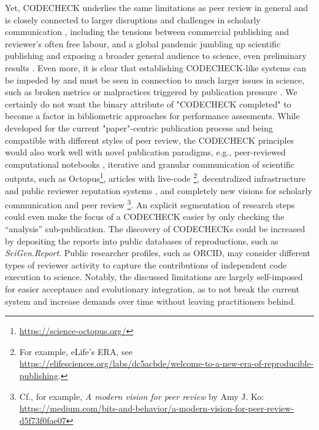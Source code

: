 \documentclass[12pt]{article}
\begin{document}
Yet, CODECHECK underlies the same limitations as peer review
in general and is closely connected to larger disruptions and challenges
in scholarly communication
\cite{eglen_recent_2018,tennant_ten_2019,fyfe_mission_2019}, 
including the tensions between commercial publishing and reviewer's often
free labour, and a global pandemic jumbling up scientific publishing
and exposing a broader general audience to science, even preliminary 
results \cite{munafo_what_2020}.
Even more, it is clear that establishing CODECHECK-like systems can be 
impeded by and must be seen in connection to much larger issues in 
science, such as broken metrics or malpractices triggered by publication
pressure \cite{piwowar_altmetrics:_2013,nosek_promoting_2015}.
We certainly do not want the binary attribute of "CODECHECK completed"
to become a factor in bibliometric approaches for performance assesments.
While developed for the current "paper"-centric publication process and
being compatible with different styles of peer review, the CODECHECK 
principles would also work well with novel publication paradigms, e.g.,
peer-reviewed computational notebooks \cite{earthcube_new_2020},
iterative and granular communication of scientific outputs,
such as Octopus\footnote{\url{https://science-octopus.org/}}, 
articles with live-code \cite{perkel_pioneering_2019-1}
\footnote{For example, eLife's ERA, see 
\url{https://elifesciences.org/labs/dc5acbde/welcome-to-a-new-era-of-reproducible-publishing}.},
decentralized infrastructure and public reviewer reputation systems
\cite{tenorio-fornes_towards_2019},
and completely new visions for scholarly communication and peer review
\footnote{Cf., for example, \emph{A modern vision for peer review} by 
Amy J. Ko: \url{https://medium.com/bits-and-behavior/a-modern-vision-for-peer-review-d5f73f0fae07}}.
An explicit segmentation of research steps could even make the focus 
of a CODECHECK easier by only checking the ``analysis'' sub-publication.
The discovery of CODECHECKs could be increased by depositing the reports
into public databases of reproductions, such as \emph{SciGen.Report}.
Public researcher profiles, such as ORCID, may consider different
types of reviewer activity to capture the contributions of independent 
code execution to science.
Notably, the discussed limitations are largely self-imposed for easier
acceptance and evolutionary integration, as to not break the current 
system and increase demands over time without leaving practitioners behind. 
\end{document}
